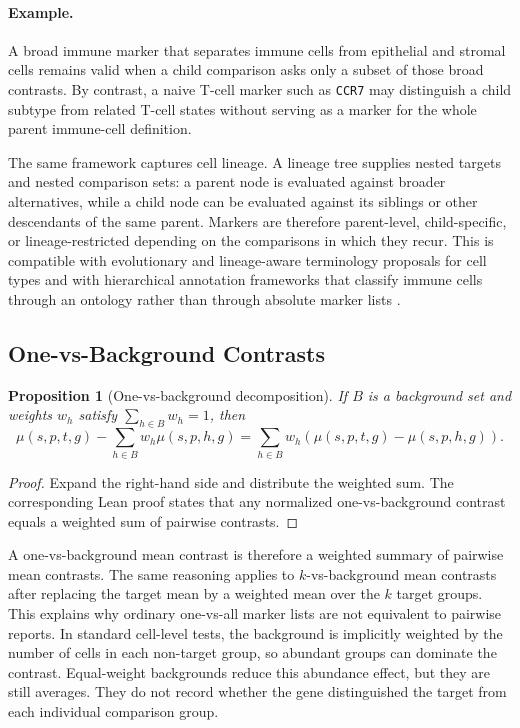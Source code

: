 \documentclass{article}
\newtheorem{proposition}{Proposition}
\begin{document}
\paragraph{Example.}
A broad immune marker that separates immune cells from epithelial and stromal cells remains valid when a child comparison asks only a subset of those broad contrasts. By contrast, a naive T-cell marker such as \texttt{CCR7} may distinguish a child subtype from related T-cell states without serving as a marker for the whole parent immune-cell definition.

The same framework captures cell lineage. A lineage tree supplies nested targets and nested comparison sets: a parent node is evaluated against broader alternatives, while a child node can be evaluated against its siblings or other descendants of the same parent. Markers are therefore parent-level, child-specific, or lineage-restricted depending on the comparisons in which they recur. This is compatible with evolutionary and lineage-aware terminology proposals for cell types \citep{Zhu2026RationalTerminology} and with hierarchical annotation frameworks that classify immune cells through an ontology rather than through absolute marker lists \citep{Beltz2026ImmuneHierarchy}.

\subsection{One-vs-Background Contrasts}

\begin{proposition}[One-vs-background decomposition]\label{prop:one-vs-background-decomposition}
If $B$ is a background set and weights $w_h$ satisfy $\sum_{h\in B}w_h=1$, then
\[
  \mu(s,p,t,g)-\sum_{h\in B}w_h\mu(s,p,h,g)
  =
  \sum_{h\in B}w_h\left(\mu(s,p,t,g)-\mu(s,p,h,g)\right).
\]
\end{proposition}

\begin{proof}
Expand the right-hand side and distribute the weighted sum. The corresponding Lean proof states that any normalized one-vs-background contrast equals a weighted sum of pairwise contrasts.
\end{proof}

A one-vs-background mean contrast is therefore a weighted summary of pairwise mean contrasts. The same reasoning applies to $k$-vs-background mean contrasts after replacing the target mean by a weighted mean over the $k$ target groups. This explains why ordinary one-vs-all marker lists are not equivalent to pairwise reports. In standard cell-level tests, the background is implicitly weighted by the number of cells in each non-target group, so abundant groups can dominate the contrast. Equal-weight backgrounds reduce this abundance effect, but they are still averages. They do not record whether the gene distinguished the target from each individual comparison group.
\end{document}
